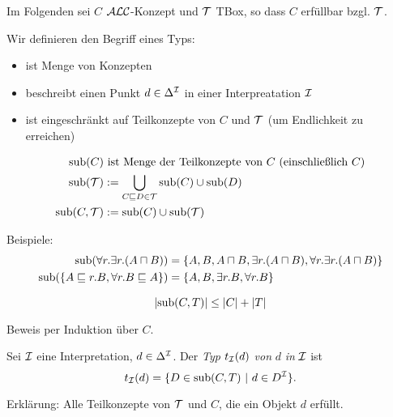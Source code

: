 Im Folgenden sei $C$ $\mathcal{A}\mathcal{L}\mathcal{C}$-Konzept und $\mathcal{T}$ TBox, so dass $C$ erfüllbar bzgl. $\mathcal{T}$.

Wir definieren den Begriff eines Typs:

\begin{itemize}
  \item ist Menge von Konzepten
  \item beschreibt einen Punkt $d \in \Delta^{\mathcal{I}}$ in einer Interpreatation $\mathcal{I}$
  \item ist eingeschränkt auf Teilkonzepte von $C$ und $\mathcal{T}$ (um Endlichkeit zu erreichen)
\end{itemize}

\begin{definition}[Teilkonzepte]
    \begin{align*}
        \operatorname{sub}(C)&\ \text{ist Menge der Teilkonzepte von $C$ (einschließlich $C$)}\\
        \operatorname{sub}(\mathcal{T})&:= \bigcup_{C \sqsubseteq D \in \mathcal{T}}\operatorname{sub}(C) \cup \operatorname{sub}( D) \\
        \operatorname{sub}(C,\mathcal{T})&:= \operatorname{sub}(C) \cup \operatorname{sub}( \mathcal{T})
    \end{align*}
\end{definition}

\begin{tafel}
Beispiele:
\begin{align*}
    \sub\left(\forall r.\exists r.(A \sqcap B)\right) &= \{A,B,A \sqcap B, \exists r.(A \sqcap B), \forall r.\exists r.(A \sqcap B)\}\\
    \sub\left(\{A \sqsubseteq r.B, \forall r.B \sqsubseteq A\}\right) &= \{A,B, \exists r.B, \forall r.B\}
\end{align*}
\end{tafel}

\begin{lemma}
    \label{lem:num-sub}
    \[ \left| \sub\left( C,T \right) \right| \leq \left| C \right| + \left| T \right| \]
\end{lemma}
Beweis per Induktion über $C$.

\begin{definition}
Sei $\mathcal{I}$ eine Interpretation, $d \in \Delta^{\mathcal{I}}$. Der \emph{Typ}
$t_\MI\left( d \right)$ \emph{von} $d$ \emph{in} $\mathcal{I}$ ist
\[ t_\MI\left( d \right) = \left\{ D \in \sub\left( C,T \right)\  \right|\ d \in D^\MI\}. \]
\end{definition}
Erklärung: Alle Teilkonzepte von $\mathcal{T}$ und $C$, die ein Objekt $d$
erfüllt.

